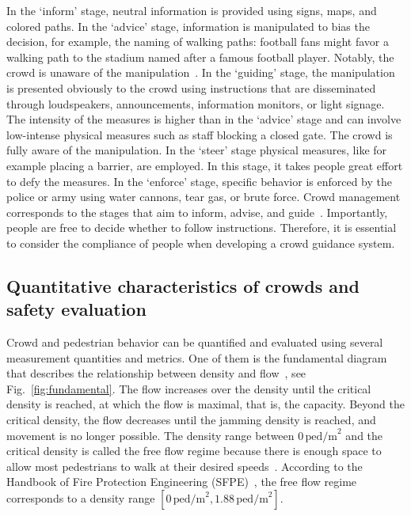 In the `inform' stage, neutral information is provided using signs, maps, and colored paths. In the `advice' stage, information is manipulated to bias the decision, for example, the naming of walking paths: football fans might favor a walking path to the stadium named after a famous football player. Notably, the crowd is unaware of the manipulation~\cite[p.169]{feliciani-2021-cdyn}. 
In the `guiding' stage, the manipulation is presented obviously to the crowd using instructions that are disseminated through loudspeakers, announcements, information monitors, or light signage.  
The intensity of the measures is higher than in the `advice' stage and can involve low-intense physical measures such as staff blocking a closed gate. The crowd is fully aware of the manipulation.
In the `steer' stage physical measures, like for example placing a barrier, are employed. In this stage, it takes people great effort to defy the measures. In the `enforce' stage, specific behavior is enforced by the police or army using water cannons, tear gas, or brute force. Crowd management corresponds to the stages that aim to inform, advise, and guide~\cite{feliciani-2021-cdyn}. Importantly, people are free to decide whether to follow instructions. Therefore, it is essential to consider the compliance of people when developing a crowd guidance system.





\subsection{Quantitative characteristics of crowds and safety evaluation }
\label{sec:fundamentaldiagram}
 
Crowd and pedestrian behavior can be quantified and evaluated using several measurement quantities and metrics. One of them is the fundamental diagram that describes the relationship between density and flow~\cite{adrian-2019-cdyn}, see Fig.~\ref{fig:fundamental}. The flow increases over the density until the critical density is reached, at which the flow is maximal, that is, the capacity. Beyond the critical density, the flow decreases until the jamming density is reached, and movement is no longer possible.
The density range between $0\,\text{ped/m}^2$ and the critical density is called the free flow regime because there is enough space to allow most pedestrians to walk at their desired speeds~\cite{feliciani-2021-cdyn}. According to the Handbook of Fire Protection Engineering (SFPE)~\cite{hurley-2016-cdyn}, the free flow regime corresponds to a density range $[0\,\text{ped/m}^2, 1.88\,\text{ped/m}^2]$. 


